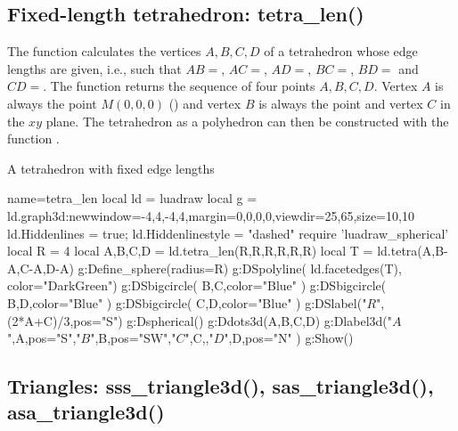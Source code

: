 \subsection{Fixed-length tetrahedron: tetra\_len()}

The function  calculates the vertices $A,B,C,D$ of a tetrahedron whose edge lengths are given, i.e., such that $AB=$, $AC=$, $AD=$, $BC=$, $BD=$ and $CD=$. The function returns the sequence of four points $A,B,C,D$. Vertex $A$ is always the point $M(0,0,0)$ () and vertex $B$ is always the point  and vertex $C$ in the $xy$ plane. The tetrahedron as a polyhedron can then be constructed with the function .

\begin{demo}{A tetrahedron with fixed edge lengths}
\begin{luadraw}{name=tetra_len}
local ld = luadraw
local g = ld.graph3d:new{window={-4,4,-4,4},margin={0,0,0,0},viewdir={25,65},size={10,10}}
ld.Hiddenlines = true; ld.Hiddenlinestyle = "dashed"
require 'luadraw_spherical'
local R = 4
local A,B,C,D = ld.tetra_len(R,R,R,R,R,R)
local T = ld.tetra(A,B-A,C-A,D-A)
g:Define_sphere({radius=R})
g:DSpolyline( ld.facetedges(T), {color="DarkGreen"})
g:DSbigcircle( {B,C},{color="Blue"} )
g:DSbigcircle( {B,D},{color="Blue"} )
g:DSbigcircle( {C,D},{color="Blue"}  )
g:DSlabel("$R$",(2*A+C)/3,{pos="S"})
g:Dspherical()
g:Ddots3d({A,B,C,D})
g:Dlabel3d("$A$",A,{pos="S"},"$B$",B,{pos="SW"},"$C$",C,{},"$D$",D,{pos="N"} )
g:Show()
\end{luadraw}
\end{demo}

\subsection{Triangles: sss\_triangle3d(), sas\_triangle3d(), asa\_triangle3d()}

